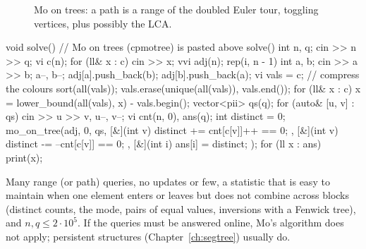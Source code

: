 \begin{figure}[htbp]
\centering
{}
\caption{Mo on trees: a path is a range of the doubled Euler tour, toggling vertices, plus possibly the LCA.}
\label{fig:motree}
\end{figure}

\begin{code}
void solve() {  // Mo on trees (cpmotree) is pasted above solve()
    int n, q;
    cin >> n >> q;
    vi c(n);
    for (ll& x : c) cin >> x;
    vvi adj(n);
    rep(i, n - 1) {
        int a, b;
        cin >> a >> b;
        a--, b--;
        adj[a].push_back(b);
        adj[b].push_back(a);
    }
    vi vals = c;  // compress the colours
    sort(all(vals));
    vals.erase(unique(all(vals)), vals.end());
    for (ll& x : c) x = lower_bound(all(vals), x) - vals.begin();
    vector<pii> qs(q);
    for (auto& [u, v] : qs) cin >> u >> v, u--, v--;
    vi cnt(n, 0), ans(q);
    int distinct = 0;
    mo_on_tree(adj, 0, qs, [&](int v) { distinct += cnt[c[v]]++ == 0; },
               [&](int v) { distinct -= --cnt[c[v]] == 0; },
               [&](int i) { ans[i] = distinct; });
    for (ll x : ans) print(x);
}
\end{code}


\begin{recognize}
Many range (or path) queries, no updates or few, a statistic that is easy to maintain when one element enters or leaves but does not
combine across blocks (distinct counts, the mode, pairs of equal values, inversions with a Fenwick tree), and $n, q \le 2 \cdot 10^5$.
If the queries must be answered online, Mo's algorithm does not apply; persistent structures (Chapter~\ref{ch:segtree}) usually do.
\end{recognize}

